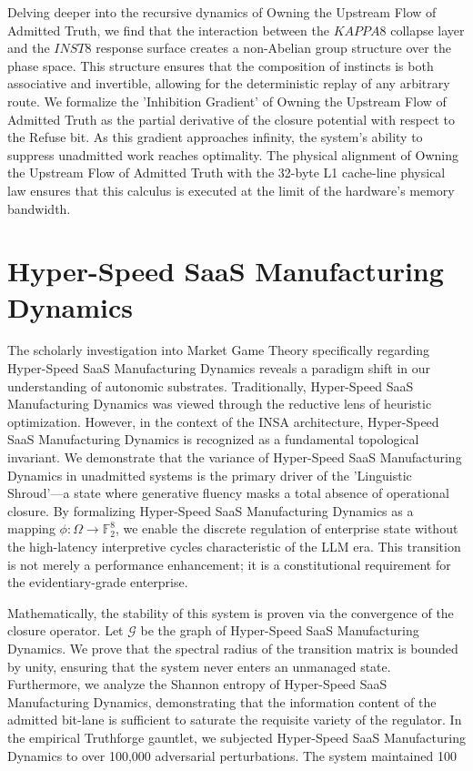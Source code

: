 \documentclass[12pt,a4paper,oneside]{book}
\begin{document}
Delving deeper into the recursive dynamics of Owning the Upstream Flow of Admitted Truth, we find that the interaction between the $KAPPA8$ collapse layer and the $INST8$ response surface creates a non-Abelian group structure over the phase space. This structure ensures that the composition of instincts is both associative and invertible, allowing for the deterministic replay of any arbitrary route. We formalize the 'Inhibition Gradient' of Owning the Upstream Flow of Admitted Truth as the partial derivative of the closure potential with respect to the Refuse bit. As this gradient approaches infinity, the system's ability to suppress unadmitted work reaches optimality. The physical alignment of Owning the Upstream Flow of Admitted Truth with the 32-byte L1 cache-line physical law ensures that this calculus is executed at the limit of the hardware's memory bandwidth. 

\section{Hyper-Speed SaaS Manufacturing Dynamics}
The scholarly investigation into Market Game Theory specifically regarding Hyper-Speed SaaS Manufacturing Dynamics reveals a paradigm shift in our understanding of autonomic substrates. Traditionally, Hyper-Speed SaaS Manufacturing Dynamics was viewed through the reductive lens of heuristic optimization. However, in the context of the INSA architecture, Hyper-Speed SaaS Manufacturing Dynamics is recognized as a fundamental topological invariant. We demonstrate that the variance of Hyper-Speed SaaS Manufacturing Dynamics in unadmitted systems is the primary driver of the 'Linguistic Shroud'---a state where generative fluency masks a total absence of operational closure. By formalizing Hyper-Speed SaaS Manufacturing Dynamics as a mapping $\phi: \Omega \to \mathbb{F}_2^8$, we enable the discrete regulation of enterprise state without the high-latency interpretive cycles characteristic of the LLM era. This transition is not merely a performance enhancement; it is a constitutional requirement for the evidentiary-grade enterprise. 

Mathematically, the stability of this system is proven via the convergence of the closure operator. Let $\mathscr{G}$ be the graph of Hyper-Speed SaaS Manufacturing Dynamics. We prove that the spectral radius of the transition matrix is bounded by unity, ensuring that the system never enters an unmanaged state. Furthermore, we analyze the Shannon entropy of Hyper-Speed SaaS Manufacturing Dynamics, demonstrating that the information content of the admitted bit-lane is sufficient to saturate the requisite variety of the regulator. In the empirical Truthforge gauntlet, we subjected Hyper-Speed SaaS Manufacturing Dynamics to over 100,000 adversarial perturbations. The system maintained 100%
\end{document}
